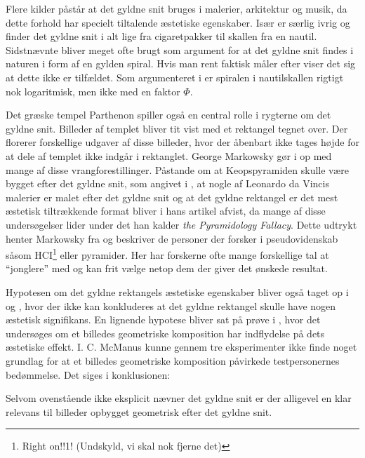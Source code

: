 {
Flere kilder påstår at det gyldne snit bruges i malerier, arkitektur og
musik, da dette forhold har specielt tiltalende æstetiske
egenskaber\cite{GoldenNumber}\cite{RatioArt}\cite{Putz1995}\cite{Stakhov2006490}\cite{Boussora2004}.
Især \cite{GoldenNumber} er særlig ivrig og finder det gyldne snit i alt
lige fra cigaretpakker til skallen fra en nautil. Sidstnævnte bliver
meget ofte brugt som argument for at det gyldne snit findes i naturen i
form af en gylden spiral. Hvis man rent faktisk måler efter viser det
sig at dette ikke er tilfældet. Som argumenteret i \cite{Sharp2002} er
spiralen i nautilskallen rigtigt nok logaritmisk, men ikke med en faktor
$\varPhi$.

Det græske tempel Parthenon spiller også en central rolle i rygterne om
det gyldne snit. Billeder af templet bliver tit vist med et rektangel
tegnet over. Der florerer forskellige udgaver af disse billeder, hvor
der åbenbart ikke tages højde for at dele af templet ikke indgår i
rektanglet. George Markowsky gør i \cite{Markowsky1992} op med mange af
disse vrangforestillinger. Påstande om at Keopspyramiden skulle være
bygget efter det gyldne snit, som angivet i \cite{Stakhov2006490}, at
nogle af Leonardo da Vincis malerier er malet efter det gyldne snit og
at det gyldne rektangel er det mest æstetisk tiltrækkende
format\cite{GoldenNumber}\cite{RatioArt} bliver i hans artikel afvist,
da mange af disse undersøgelser lider under det han kalder \emph{the
Pyramidology Fallacy}. Dette udtrykt henter Markowsky fra
\cite{Gardner1952_2} og beskriver de personer der forsker i
pseudovidenskab såsom HCI\footnote{Right on!!1!  (Undskyld, vi skal nok
fjerne det)} eller pyramider. Her har forskerne ofte mange forskellige
tal at ``jonglere'' med og kan frit vælge netop dem der giver det
ønskede resultat.

Hypotesen om det gyldne rektangels æstetiske egenskaber bliver også
taget op i \cite{Boselie1984} og \cite{Plug1980}, hvor der ikke kan
konkluderes at det gyldne rektangel skulle have nogen æstetisk
signifikans. En lignende hypotese bliver sat på prøve i
\cite{McManus1995}, hvor det undersøges om et billedes geometriske
komposition har indflydelse på dets æstetiske effekt. I. C. McManus
kunne gennem tre eksperimenter ikke finde noget grundlag for at et
billedes geometriske komposition påvirkede testpersonernes bedømmelse.
Det siges i konklusionen:


Selvom ovenstående ikke eksplicit nævner det gyldne snit er der
alligevel en klar relevans til billeder opbygget geometrisk efter det
gyldne snit.
}
